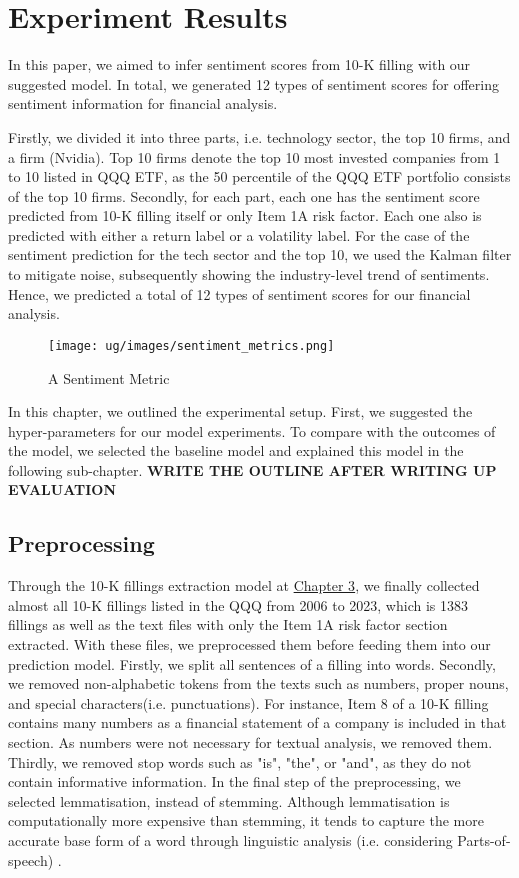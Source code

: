 \documentclass[logo,bsc,singlespacing,parskip]{infthesis}
\begin{document}
\chapter{Experiment Results}
In this paper, we aimed to infer sentiment scores from 10-K filling with our suggested model. In total, we generated 12 types of sentiment scores for offering sentiment information for financial analysis. 

Firstly, we divided it into three parts, i.e. technology sector, the top 10 firms, and a firm (Nvidia).  Top 10 firms denote the top 10 most invested companies from 1 to 10 listed in QQQ ETF, as the 50 percentile of the QQQ ETF portfolio consists of the top 10 firms. Secondly, for each part, each one has the sentiment score predicted from 10-K filling itself or only Item 1A risk factor. Each one also is predicted with either a return label or a volatility label. For the case of the sentiment prediction for the tech sector and the top 10, we used the Kalman filter to mitigate noise, subsequently showing the industry-level trend of sentiments. Hence, we predicted a total of 12 types of sentiment scores for our financial analysis.

\begin{figure}[h!]
    \centering
    \texttt{[image: ug/images/sentiment\_metrics.png]}
    \caption{A Sentiment Metric}
    \label{fig:sentiment-metrics}
\end{figure}


In this chapter, we outlined the experimental setup. First, we suggested the hyper-parameters for our model experiments. To compare with the outcomes of the model, we selected the baseline model and explained this model in the following sub-chapter. \textbf{WRITE THE OUTLINE AFTER WRITING UP EVALUATION}

\section{Preprocessing}

Through the 10-K fillings extraction model at \hyperref[extraction-model]{Chapter 3}, we finally collected almost all 10-K fillings listed in the QQQ from 2006 to 2023, which is 1383 fillings as well as the text files with only the Item 1A risk factor section extracted. With these files, we preprocessed them before feeding them into our prediction model. Firstly, we split all sentences of a filling into words. Secondly, we removed non-alphabetic tokens from the texts such as numbers, proper nouns, and special characters(i.e. punctuations). For instance, Item 8 of a 10-K filling contains many numbers as a financial statement of a company is included in that section. As numbers were not necessary for textual analysis, we removed them. Thirdly, we removed stop words such as "is", "the", or "and", as they do not contain informative information.  In the final step of the preprocessing, we selected lemmatisation, instead of stemming. Although lemmatisation is computationally more expensive than stemming, it tends to capture the more accurate base form of a word through linguistic analysis (i.e. considering Parts-of-speech) \cite{AnalyticsVidhya2022}.
\end{document}
